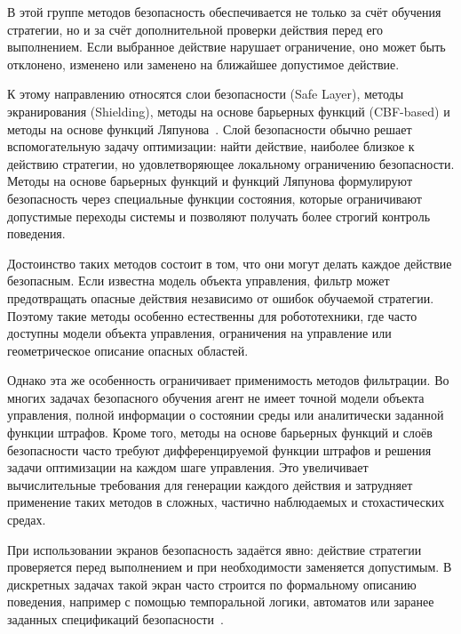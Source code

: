 В этой группе методов безопасность обеспечивается не только за счёт обучения стратегии, но и за счёт дополнительной проверки действия перед его выполнением. Если выбранное действие нарушает ограничение, оно может быть отклонено, изменено или заменено на ближайшее допустимое действие.

К этому направлению относятся слои безопасности (Safe Layer), методы экранирования (Shielding), методы на основе барьерных функций (CBF-based) и методы на основе функций Ляпунова~\cite{dalal2018safe,sac-rcbf,koller2018learning,gu2022review}. Слой безопасности обычно решает вспомогательную задачу оптимизации: найти действие, наиболее близкое к действию стратегии, но удовлетворяющее локальному ограничению безопасности. Методы на основе барьерных функций и функций Ляпунова формулируют безопасность через специальные функции состояния, которые ограничивают допустимые переходы системы и позволяют получать более строгий контроль поведения.

Достоинство таких методов состоит в том, что они могут делать каждое действие безопасным. Если известна модель объекта управления, фильтр может предотвращать опасные действия независимо от ошибок обучаемой стратегии. Поэтому такие методы особенно естественны для робототехники, где часто доступны модели объекта управления, ограничения на управление или геометрическое описание опасных областей.

Однако эта же особенность ограничивает применимость методов фильтрации. Во многих задачах безопасного обучения агент не имеет точной модели объекта управления, полной информации о состоянии среды или аналитически заданной функции штрафов. Кроме того, методы на основе барьерных функций и слоёв безопасности часто требуют дифференцируемой функции штрафов и решения задачи оптимизации на каждом шаге управления. Это увеличивает вычислительные требования для генерации каждого действия и затрудняет применение таких методов в сложных, частично наблюдаемых и стохастических средах.

При использовании экранов безопасность задаётся явно: действие стратегии проверяется перед выполнением и при необходимости заменяется допустимым. В дискретных задачах такой экран часто строится по формальному описанию поведения, например с помощью темпоральной логики, автоматов или заранее заданных спецификаций безопасности~\cite{hunt2021verifiably,yangsafe}.

